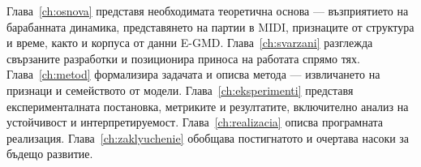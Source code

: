 Глава~\ref{ch:osnova} представя необходимата теоретична основа — възприятието
на барабанната динамика, представянето на партии в MIDI, признаците от
структура и време, както и корпуса от данни E-GMD. Глава~\ref{ch:svarzani}
разглежда свързаните разработки и позиционира приноса на работата спрямо тях.
Глава~\ref{ch:metod} формализира задачата и описва метода — извличането на
признаци и семейството от модели. Глава~\ref{ch:eksperimenti} представя
експерименталната постановка, метриките и резултатите, включително анализ на
устойчивост и интерпретируемост. Глава~\ref{ch:realizacia} описва програмната
реализация. Глава~\ref{ch:zaklyuchenie} обобщава постигнатото и очертава насоки
за бъдещо развитие.
